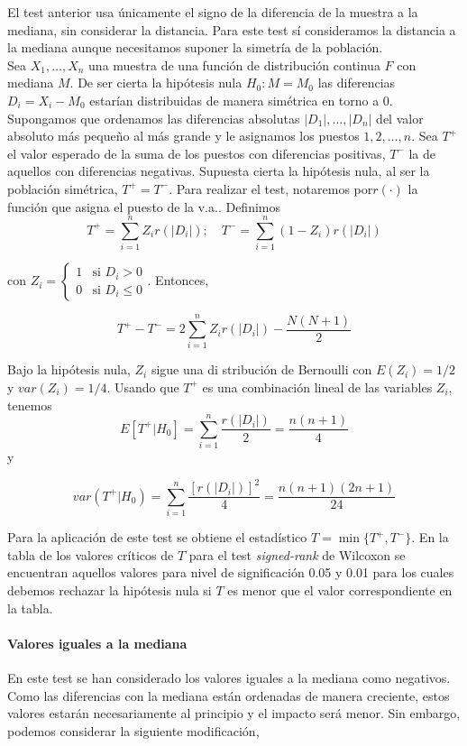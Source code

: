 	El test anterior usa únicamente el signo de la diferencia de la muestra a la mediana, sin considerar la distancia. Para este test sí consideramos la distancia a la mediana aunque necesitamos suponer la simetría de la población. \\
	Sea $X_1, \dots, X_n$ una muestra de una función de distribución continua $F$ con mediana $M$. De ser cierta la hipótesis nula $H_0: M = M_0$ las diferencias $D_i = X_i - M_0$ estarían distribuidas de manera simétrica en torno a 0.\\
	Supongamos que ordenamos las diferencias absolutas $|D_1|, \dots, |D_n|$ del valor absoluto más pequeño al más grande y le asignamos los puestos $1, 2, \dots, n$. Sea $T^+$ el valor esperado de la suma de los puestos con diferencias positivas, $T^-$ la de aquellos con diferencias negativas. Supuesta cierta la hipótesis nula, al ser la población simétrica, $T^+ = T^-$. Para realizar el test, notaremos por$r(\cdot)$ la función que asigna el puesto de la v.a.. Definimos
	\[ T^+ = \sum\limits_{i=1}^n Z_i r(|D_i|); \quad
	   T^- = \sum\limits_{i=1}^n (1-Z_i) r(|D_i|) \]
	   
	 con $ Z_i = \left\lbrace \begin{array}{ll}
	 				1 & \text{si } D_i > 0 \\
	 				0 & \text{si } D_i \leq 0
	 		\end{array} \right.$. Entonces,
	 		
	\[ T^+  - T^- = 2 \sum\limits_{i=1}^n
					 Z_i r(|D_i|) - \frac{N(N+1)}{2} \]
	
	Bajo la hipótesis nula, $Z_i$ sigue una di stribución de Bernoulli con $E(Z_i) = 1/2$ y $var(Z_i) = 1/4$. Usando que $T^+$ es una combinación lineal de las variables $Z_i$, tenemos
	\[ E[ T^+ | H_0 ] = \sum\limits_{i=1}^n 
						\frac{r(|D_i|)}{2} 
					= \frac{n(n+1)}{4}			\]
	y
	
	\[ var( T^+ | H_0 ) = \sum\limits_{i=1}^n 
						\frac{[r(|D_i|)]^2}{4} 
					= \frac{n(n+1)(2n+1)}{24}	\]
					
	Para la aplicación de este test se obtiene el estadístico $T = \min \{ T^+, T^- \}$. En la tabla de los valores críticos de $T$ para el test \textit{signed-rank} de Wilcoxon \cite[Tabla A5]{SHESKIN11} se encuentran aquellos valores para nivel de significación 0.05 y 0.01 para los cuales debemos rechazar la hipótesis nula si $T$ es menor que el valor correspondiente en la tabla.\\
	
\paragraph{Valores iguales a la mediana} En este test se han considerado los valores iguales a la mediana como negativos. Como las diferencias con la mediana están ordenadas de manera creciente, estos valores estarán necesariamente al principio y el impacto será menor. Sin embargo, podemos considerar la siguiente modificación,

